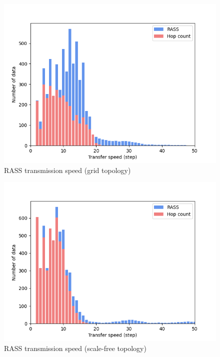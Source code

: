 \begin{figure}
    \includegraphics[width=16cm]{figures/dora_mesh/grid_speed.png}
    \caption{RASS transmission speed (grid topology)}
    \label{results:grid_100_speed}
\end{figure}

\begin{figure}
    \includegraphics[width=16cm]{figures/dora_mesh/scale_speed.png}
        \caption{RASS transmission speed (scale-free topology)}
        \label{results:scale_100_speed}
\end{figure}

